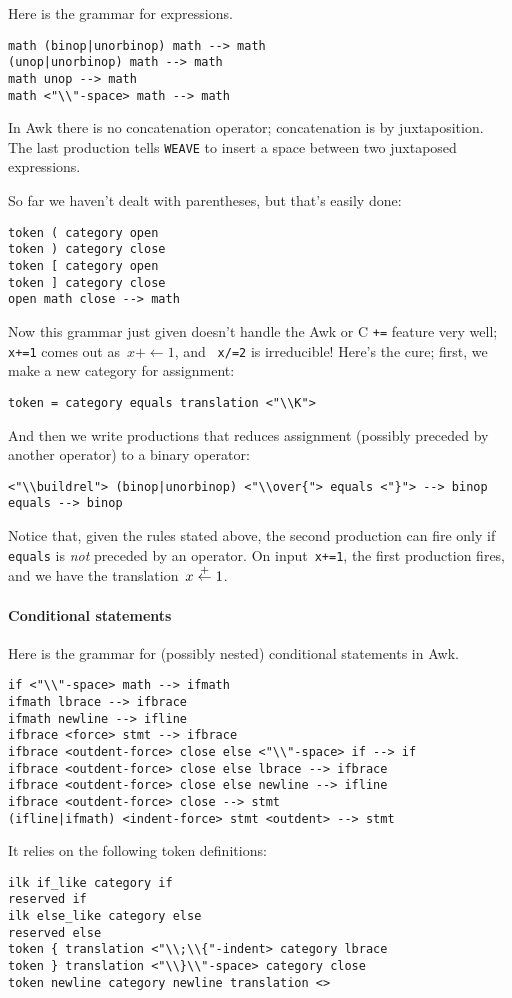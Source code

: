 Here is the grammar for expressions.
\begin{verbatim}
math (binop|unorbinop) math --> math
(unop|unorbinop) math --> math
math unop --> math
math <"\\"-space> math --> math
\end{verbatim}
In Awk there is no concatenation operator; concatenation is by
juxtaposition.
The last production tells {\tt WEAVE} to insert a space between two
juxtaposed expressions.

So far we haven't dealt with parentheses, but that's easily done:
\begin{verbatim}
token ( category open
token ) category close
token [ category open
token ] category close
open math close --> math
\end{verbatim}


Now this grammar just given doesn't handle the Awk or C {\tt +=}
feature very well; {\tt x+=1} comes out as~$x+\leftarrow 1$, and {\tt
x/=2} is irreducible!
Here's the cure; first, we make a new category for assignment:
\begin{verbatim}
token = category equals translation <"\\K">
\end{verbatim}
And then we write productions that reduces assignment (possibly
preceded by another operator) to a binary operator:
\begin{verbatim}
<"\\buildrel"> (binop|unorbinop) <"\\over{"> equals <"}"> --> binop
equals --> binop
\end{verbatim}
Notice that, given the rules stated above, the second production can
fire only if {\tt equals} is {\em not} preceded by an operator.
On input~{\tt x+=1}, the first production fires, and we have the
translation~$x\buildrel+\over{\leftarrow} 1$. 

\paragraph{Conditional statements}
Here is the grammar for (possibly nested) conditional statements in
Awk.
\begin{verbatim}
if <"\\"-space> math --> ifmath
ifmath lbrace --> ifbrace
ifmath newline --> ifline
ifbrace <force> stmt --> ifbrace
ifbrace <outdent-force> close else <"\\"-space> if --> if
ifbrace <outdent-force> close else lbrace --> ifbrace
ifbrace <outdent-force> close else newline --> ifline
ifbrace <outdent-force> close --> stmt
(ifline|ifmath) <indent-force> stmt <outdent> --> stmt
\end{verbatim}
It relies on the following token definitions:
\begin{verbatim}
ilk if_like category if
reserved if
ilk else_like category else
reserved else
token { translation <"\\;\\{"-indent> category lbrace
token } translation <"\\}\\"-space> category close
token newline category newline translation <>
\end{verbatim}

